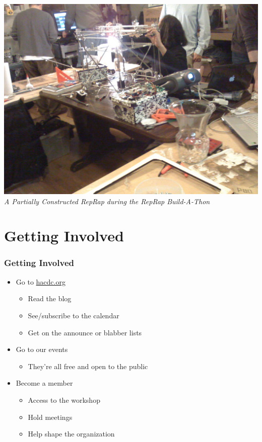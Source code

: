 \documentclass[notes]{beamer}
\begin{document}
\begin{frame}
  \begin{center}
  \includegraphics[height=.8\textheight]{reprap.jpg}\\
  {\small {\em A Partially Constructed RepRap during the RepRap Build-A-Thon}}
\end{center}
\end{frame}

\section{Getting Involved}

\begin{frame}
  \frametitle{Getting Involved}
  \begin{itemize}
  \item Go to \href{http://hacdc.org}{hacdc.org}
    \begin{itemize}
    \item Read the blog
    \item See/subscribe to the calendar
    \item Get on the announce or blabber lists
    \end{itemize}
  \item Go to our events
    \begin{itemize}
    \item They're all free and open to the public
    \end{itemize}
  \item Become a member
    \begin{itemize}
    \item Access to the workshop
    \item Hold meetings
    \item Help shape the organization
    \end{itemize}
  \end{itemize}
\end{frame}
\end{document}
